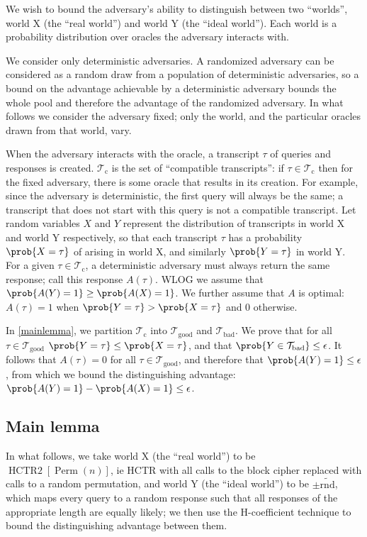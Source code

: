 \documentclass[letterpaper,11pt]{article}
\newcommand*{\Tb}{\mathcal{T}_\mathrm{bad}}
\newcommand*{\Tc}{\mathcal{T}_\mathrm{c}}
\newcommand*{\Tg}{\mathcal{T}_\mathrm{good}}
\DeclareMathOperator{\HCTR}{HCTR2}
\DeclareMathOperator{\Perm}{Perm}
\begin{document}
We wish to bound the adversary's ability to distinguish between
two ``worlds'', world X (the ``real world'') and world Y (the ``ideal world'').
Each world is a probability distribution over oracles the adversary
interacts with.

We consider only deterministic adversaries.
A randomized adversary can be considered as a random draw
from a population of deterministic adversaries, so
a bound on the advantage achievable by a deterministic
adversary bounds the whole pool and therefore
the advantage of the randomized adversary. In what follows
we consider the adversary fixed; only the world, and the
particular oracles drawn from that world, vary.

When the adversary interacts with the oracle,
a transcript \(\tau\) of queries and responses is created.
\(\Tc\) is the set of ``compatible transcripts'':
if \(\tau \in \Tc\) then for the fixed adversary,
there is some oracle
that results in its creation. For example,
since the adversary is deterministic, the first query
will always be the same; a transcript that
does not start with this query is not a compatible transcript.
Let random variables \(X\) and \(Y\)
represent the distribution of transcripts
in world X and world Y respectively, so that
each transcript \(\tau\) has a probability \(\prob{X = \tau}\)
of arising in world X, and similarly \(\prob{Y = \tau}\) in world Y.
For a given \(\tau \in \Tc\),
a deterministic adversary must always
return the same response; call this response \(A(\tau)\).
WLOG we assume that \(\prob{A(Y) = 1} \geq \prob{A(X) = 1}\).
We further assume that \(A\) is optimal:
\(A(\tau) = 1\)
when \(\prob{Y = \tau} > \prob{X = \tau}\) and 0 otherwise.

In \autoref{mainlemma}, we partition \(\Tc\) into \(\Tg\) and \(\Tb\). 
We prove that for all \(\tau \in \Tg\)
\(\prob{Y = \tau} \leq \prob{X = \tau}\),
and that \(\prob{Y \in \Tb} \leq \epsilon\).
It follows that \(A(\tau) = 0\) for all \(\tau \in \Tg\),
and therefore that \(\prob{A(Y) = 1} \leq \epsilon\),
from which we bound the distinguishing advantage:
\(\prob{A(Y) = 1} - \prob{A(X) = 1} \leq \epsilon\).

\subsection{Main lemma}\label{mainlemma}
In what follows, we take world X (the ``real world'') 
to be \(\HCTR[\Perm(n)]\),
ie HCTR with all calls to the block cipher
replaced with calls to a random permutation,
and world Y (the ``ideal world'') to be \(\pm\widetilde{\mathrm{rnd}}\),
which maps every query to a random response such that
all responses of the appropriate length are equally likely;
we then use the H-coefficient technique to bound
the distinguishing advantage between them.
\end{document}
